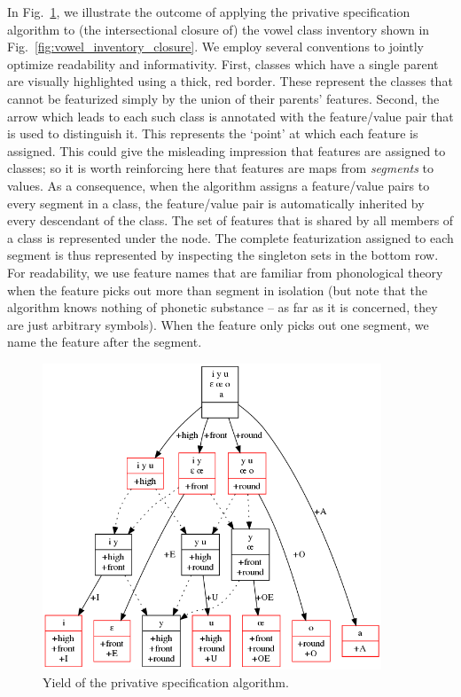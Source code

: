 \documentclass[11pt, oneside]{article}   	%
\begin{document}
\vspace{\baselineskip} In Fig.~\ref{fig:privative}, we illustrate the outcome of applying the privative specification algorithm to (the intersectional closure of) the vowel class inventory shown in Fig.~\ref{fig:vowel_inventory_closure}. We employ several conventions to jointly optimize readability and informativity. First, classes which have a single parent are visually highlighted using a thick, red border. These represent the classes that cannot be featurized simply by the union of their parents' features. Second, the arrow which leads to each such class is annotated with the feature/value pair that is used to distinguish it. This represents the `point' at which each feature is assigned. This could give the misleading impression that features are assigned to classes; so it is worth reinforcing here that features are maps from \textit{segments} to values. As a consequence, when the algorithm assigns a feature/value pairs to every segment in a class, the feature/value pair is automatically inherited by every descendant of the class. The set of features that is shared by all members of a class is represented under the node. The complete featurization assigned to each segment is thus represented by inspecting the singleton sets in the bottom row. For readability, we use feature names that are familiar from phonological theory when the feature picks out more than segment in isolation (but note that the algorithm knows nothing of phonetic substance -- as far as it is concerned, they are just arbitrary symbols). When the feature only picks out one segment, we name the feature after the segment.

\begin{figure}[htb!]
  \centering
  \includegraphics[width=0.9\textwidth]{vowel_inventory_privative.png}
  \caption{Yield of the privative specification algorithm.}
  \label{fig:privative}
\end{figure}
\end{document}
